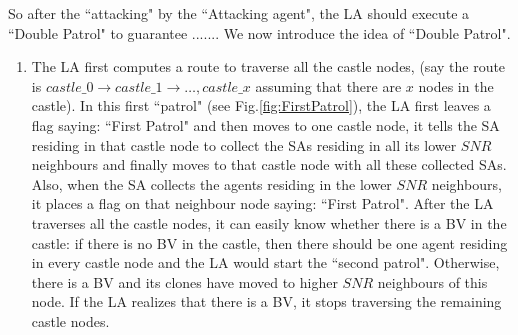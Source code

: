 So after the ``attacking" by the ``Attacking agent", the LA should execute a ``Double Patrol" \color{blue} to guarantee ....... \color{black} We  now introduce the idea of   ``Double Patrol".
\begin{enumerate}
\item 
The LA first computes a route to traverse all the castle nodes, (say the route is $castle\_0\rightarrow castle\_1 \rightarrow\ldots, castle\_x$ assuming that there are $x$ nodes in the castle). In this first ``patrol" (see Fig.\ref{fig:FirstPatrol}), the LA first leaves a flag saying: ``First Patrol" and then moves to one castle node, it tells the SA residing in that castle node to collect the SAs residing in all its lower $SNR$ neighbours and finally moves to that castle node with all these collected SAs. Also, when the SA collects the agents  residing in the lower $SNR$ neighbours, it places a flag on that neighbour node saying: ``First Patrol". After the LA traverses all the castle nodes, it can easily know whether there is a BV in the castle: if there is no BV in the castle, then there should be one agent residing in every castle node and the LA would start the ``second patrol". Otherwise, there is a BV and its clones  have moved   to higher $SNR$ neighbours of this node. If the LA realizes that there is a BV, it stops traversing the remaining castle nodes.\\ 


\end{enumerate}
